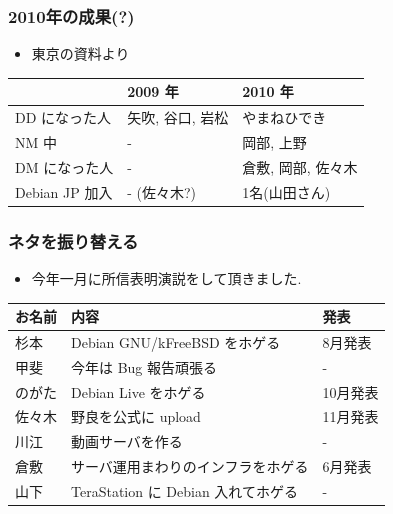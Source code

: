 \documentclass[cjk,dvipdfmx,12pt,%
hyperref={bookmarks=true,bookmarksnumbered=true,bookmarksopen=false,%
colorlinks=false,%
pdftitle={第 42 回 関西 Debian 勉強会},%
pdfauthor={倉敷・のがた・佐々木},%
pdfsubject={資料},%
}]{beamer}
\begin{document}
\begin{frame}[fragile]
\frametitle{2010年の成果(?)}

\begin{itemize}
\item 東京の資料より
\end{itemize}

\begin{tabular}{lll}
　 & 2009 年 & 2010 年 \\
\hline
DD になった人 & 矢吹, 谷口, 岩松 & やまねひでき \\
NM 中 & - & 岡部, 上野 \\
DM になった人 & - & 倉敷, 岡部, 佐々木 \\
Debian JP 加入 & - (佐々木?) & 1名(山田さん) \\
\end{tabular}

\end{frame}

\begin{frame}[fragile]
\frametitle{ネタを振り替える}

\begin{itemize}
\item 今年一月に所信表明演説をして頂きました.
\end{itemize}

\begin{tabular}{lll}
お名前 & 内容 & 発表 \\
\hline
杉本 & Debian GNU/kFreeBSD をホゲる & 8月発表 \\
甲斐 & 今年は Bug 報告頑張る & - \\
のがた & Debian Live をホゲる & 10月発表 \\
佐々木 & 野良を公式に upload & 11月発表 \\
川江 & 動画サーバを作る & - \\
倉敷 & サーバ運用まわりのインフラをホゲる & 6月発表 \\
山下 & TeraStation に Debian 入れてホゲる & - \\
\end{tabular}

\end{frame}


\end{document}
